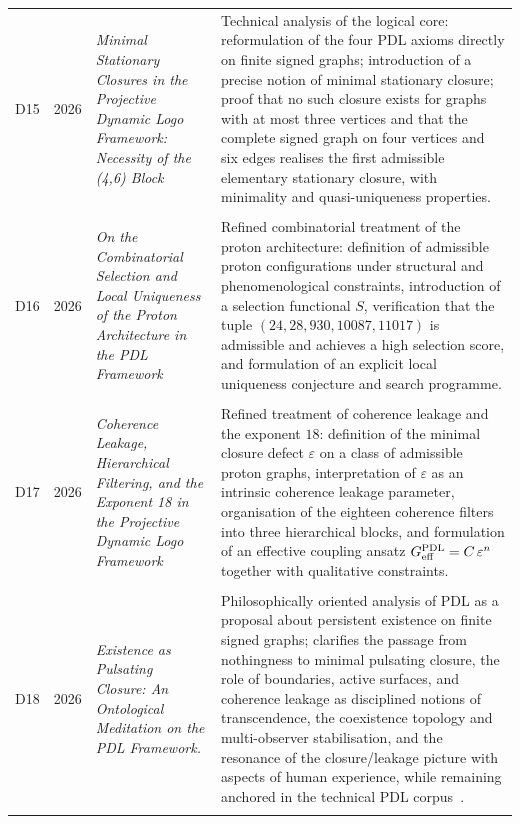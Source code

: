 \documentclass[11pt,a4paper]{article}
\newcommand{\PDL}{\textnormal{PDL}}
\begin{document}
\begin{longtable}{@{}llL{4cm}p{9.0cm}@{}}
D15 & 2026 & \textit{Minimal Stationary Closures in the Projective Dynamic Logo Framework: Necessity of the (4,6) Block} &
Technical analysis of the logical core: reformulation of the four PDL axioms directly on finite signed graphs; introduction of a precise notion of minimal stationary closure; proof that no such closure exists for graphs with at most three vertices and that the complete signed graph on four vertices and six edges realises the first admissible elementary stationary closure, with minimality and quasi-uniqueness properties. \citep{Minimal_Stationary_Closures_2026} \\\\[0.5em]

D16 & 2026 & \textit{On the Combinatorial Selection and Local Uniqueness of the Proton Architecture in the PDL Framework} &
Refined combinatorial treatment of the proton architecture: definition of admissible proton configurations under structural and phenomenological constraints, introduction of a selection functional $S$, verification that the tuple $(24,28,930,10087,11017)$ is admissible and achieves a high selection score, and formulation of an explicit local uniqueness conjecture and search programme. \citep{Proton_Local_Uniqueness_2026,Combinatorial_Proton_v2_2026} \\\\[0.5em]

D17 & 2026 & \textit{Coherence Leakage, Hierarchical Filtering, and the Exponent 18 in the Projective Dynamic Logo Framework} &
Refined treatment of coherence leakage and the exponent $18$: definition of the minimal closure defect $\varepsilon$ on a class of admissible proton graphs, interpretation of $\varepsilon$ as an intrinsic coherence leakage parameter, organisation of the eighteen coherence filters into three hierarchical blocks, and formulation of an effective coupling ansatz $G_{\mathrm{eff}}^{\PDL}=C\,\varepsilon^{n}$ together with qualitative constraints. \citep{Coherence_Leakage_18_2026,Topological_Reformulation_PDL_2026,Effective_Fields_PDL_2026} \\\\[0.5em]

D18 &
2026 &
\emph{Existence as Pulsating Closure: An Ontological Meditation on the PDL Framework.} & 
Philosophically oriented analysis of PDL as a proposal about persistent existence on finite signed graphs; clarifies the passage from nothingness to minimal pulsating closure, the role of boundaries, active surfaces, and coherence leakage as disciplined notions of transcendence, the coexistence topology and multi-observer stabilisation, and the resonance of the closure/leakage picture with aspects of human experience, while remaining anchored in the technical PDL corpus~\citep{ExistencePulsatingClosure2026}.\\\\[0.4em]


\end{longtable}
\end{document}

